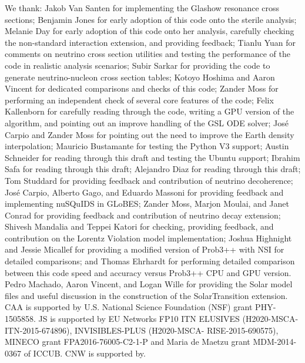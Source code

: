 \documentclass[3p,12pt]{elsarticle}
\begin{document}
We thank: Jakob Van Santen for implementing the Glashow resonance cross sections;
Benjamin Jones for early adoption of this code onto the sterile analysis;
Melanie Day for early adoption of this code onto her analysis, carefully checking the non-standard interaction extension, and providing feedback;
Tianlu Yuan for comments on neutrino cross section utilities and testing the performance of the code in realistic analysis scenarios;
Subir Sarkar for providing the code to generate neutrino-nucleon cross section tables;
Kotoyo Hoshima and Aaron Vincent for dedicated comparisons and checks of this code;
Zander Moss for performing an independent check of several core features of the code;
Felix Kallenborn for carefully reading through the code, writing a GPU version of the algorithm, and pointing out an improve handling of the GSL ODE solver;
Jos\'e Carpio and Zander Moss for pointing out the need to improve the Earth density interpolation;
Mauricio Bustamante for testing the Python V3 support;
Austin Schneider for reading through this draft and testing the Ubuntu support;
Ibrahim Safa for reading through this draft;
Alejandro Diaz for reading through this draft;
Tom Studdard for providing feedback and contribution of neutrino decoherence;
Jos\'e Carpio, Alberto Gago, and Eduardo Massoni for providing feedback and implementing nuSQuIDS in GLoBES;
Zander Moss, Marjon Moulai, and Janet Conrad for providing feedback and contribution of neutrino decay extension;
Shivesh Mandalia and Teppei Katori for checking, providing feedback, and contribution on the Lorentz Violation model implementation;
Joshua Highnight and Jessie Micallef for providing a modified version of Prob3++ with NSI for detailed comparisons; and
Thomas Ehrhardt for performing detailed comparison between this code speed and accuracy versus Prob3++ CPU and GPU version.
Pedro Machado, Aaron Vincent, and Logan Wille for providing the Solar model files and useful discussion in the construction of the SolarTransition extension.
CAA is supported by U.S. National Science Foundation (NSF) grant PHY-1505858.
JS is supported by  EU Networks FP10 ITN ELUSIVES (H2020-MSCA-ITN-2015-674896), INVISIBLES-PLUS (H2020-MSCA-
RISE-2015-690575),  MINECO grant FPA2016-76005-C2-1-P and Maria de Maetzu grant MDM-2014-0367 of ICCUB. 
CNW is supported by.


%
%


\end{document}

